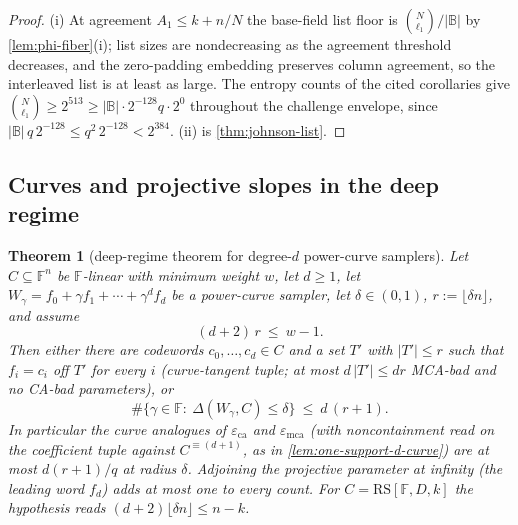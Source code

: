 \documentclass[11pt]{article}
\newtheorem{theorem}{Theorem}[section]
\theoremstyle{definition}
\theoremstyle{remark}
\newcommand{\F}{\mathbb{F}}
\newcommand{\B}{\mathbb{B}}
\newcommand{\RS}{\mathrm{RS}}
\newcommand{\eca}{\varepsilon_{\mathrm{ca}}}
\newcommand{\emca}{\varepsilon_{\mathrm{mca}}}
\newcommand{\dist}{\Delta}
\begin{document}
\begin{proof}
(i) At agreement $A_1\le k+n/N$ the base-field list floor is $\binom N{\ell_1}/|\B|$ by \cref{lem:phi-fiber}\textup{(i)}; list sizes are nondecreasing as the agreement threshold decreases, and the zero-padding embedding preserves column agreement, so the interleaved list is at least as large. The entropy counts of the cited corollaries give $\binom N{\ell_1}\ge2^{513}\ge|\B|\cdot2^{-128}q\cdot2^{0}$ throughout the challenge envelope, since $|\B|\,q\,2^{-128}\le q^2\,2^{-128}<2^{384}$. (ii) is \cref{thm:johnson-list}.
\end{proof}

\subsection{Curves and projective slopes in the deep regime}\label{sec:discharge-T5}

\begin{theorem}[deep-regime theorem for degree-$d$ power-curve samplers]\label{thm:deep-curve}
Let $C\subseteq\F^n$ be $\F$-linear with minimum weight $w$, let $d\ge1$, let $W_\gamma=f_0+\gamma f_1+\cdots+\gamma^df_d$ be a power-curve sampler, let $\delta\in(0,1)$, $r:=\lfloor\delta n\rfloor$, and assume
\[
(d+2)\,r\ \le\ w-1 .
\]
Then either there are codewords $c_0,\dots,c_d\in C$ and a set $T'$ with $|T'|\le r$ such that $f_i=c_i$ off $T'$ for every $i$ \textup(curve-tangent tuple; at most $d\,|T'|\le dr$ MCA-bad and no CA-bad parameters\textup), or
\[
\#\{\gamma\in\F:\ \dist(W_\gamma,C)\le\delta\}\ \le\ d\,(r+1).
\]
In particular the curve analogues of $\eca$ and $\emca$ \textup(with noncontainment read on the coefficient tuple against $C^{\equiv(d+1)}$, as in \cref{lem:one-support-d-curve}\textup) are at most $d(r+1)/q$ at radius $\delta$. Adjoining the projective parameter at infinity \textup(the leading word $f_d$\textup) adds at most one to every count. For $C=\RS[\F,D,k]$ the hypothesis reads $(d+2)\lfloor\delta n\rfloor\le n-k$.
\end{theorem}
\end{document}

